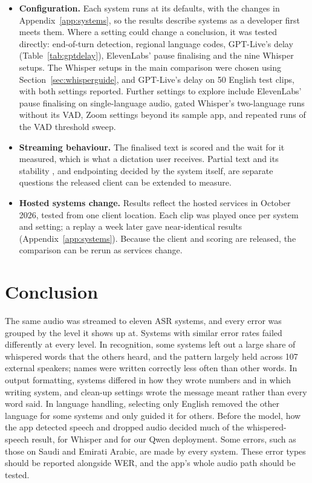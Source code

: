 \documentclass[11pt]{article}
\begin{document}
\begin{itemize}
  \item \textbf{Configuration.} Each system runs at its defaults, with the changes in Appendix~\ref{app:systems}, so the results describe systems as a developer first meets them. Where a setting could change a conclusion, it was tested directly: end-of-turn detection, regional language codes, GPT-Live's delay (Table~\ref{tab:gptdelay}), ElevenLabs' pause finalising and the nine Whisper setups. The Whisper setups in the main comparison were chosen using Section~\ref{sec:whisperguide}, and GPT-Live's delay on 50 English test clips, with both settings reported. Further settings to explore include ElevenLabs' pause finalising on single-language audio, gated Whisper's two-language runs without its VAD, Zoom settings beyond its sample app, and repeated runs of the VAD threshold sweep.
  \item \textbf{Streaming behaviour.} The finalised text is scored and the wait for it measured, which is what a dictation user receives. Partial text and its stability \citep{shangguan2020stability}, and endpointing decided by the system itself, are separate questions the released client can be extended to measure.
  \item \textbf{Hosted systems change.} Results reflect the hosted services in October 2026, tested from one client location. Each clip was played once per system and setting; a replay a week later gave near-identical results (Appendix~\ref{app:systems}). Because the client and scoring are released, the comparison can be rerun as services change.
\end{itemize}

\FloatBarrier
\section{Conclusion}\label{sec:conclusion}
The same audio was streamed to eleven ASR systems, and every error was grouped by the level it shows up at. Systems with similar error rates failed differently at every level. In recognition, some systems left out a large share of whispered words that the others heard, and the pattern largely held across 107 external speakers; names were written correctly less often than other words. In output formatting, systems differed in how they wrote numbers and in which writing system, and clean-up settings wrote the message meant rather than every word said. In language handling, selecting only English removed the other language for some systems and only guided it for others. Before the model, how the app detected speech and dropped audio decided much of the whispered-speech result, for Whisper and for our Qwen deployment. Some errors, such as those on Saudi and Emirati Arabic, are made by every system. These error types should be reported alongside WER, and the app's whole audio path should be tested.
\end{document}
